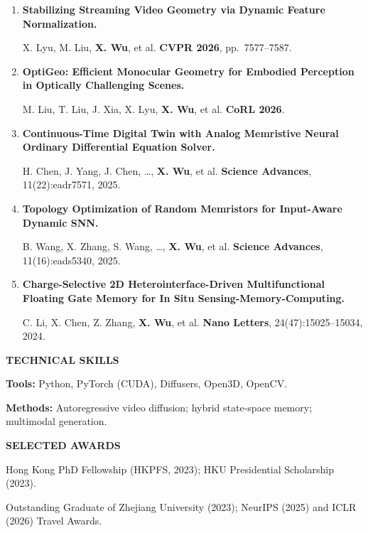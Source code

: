 \documentclass[a4paper]{article}
\newcommand{\cvsection}[1]{%
  \par\vspace{2.0pt}%
  {\color{cvblue}\fontsize{11}{12.2}\selectfont\bfseries\MakeUppercase{#1}}\par
  \vspace{-4pt}{\color{cvblue}\rule{\textwidth}{0.4pt}}\par\vspace{1.0pt}%
}
\begin{document}
{\begin{enumerate}[resume,leftmargin=1.6em,labelsep=0.38em,itemsep=0.4pt,topsep=1.3pt,parsep=0pt,partopsep=0pt]
M. Liu, X. Lyu, T. Ren, P. Dai, \textbf{X. Wu}, et al. \hfill \textbf{ECCV 2026}.
\item \textbf{Stabilizing Streaming Video Geometry via Dynamic Feature Normalization.}\par
X. Lyu, M. Liu, \textbf{X. Wu}, et al. \hfill \textbf{CVPR 2026}, pp.\ 7577--7587.
\item \textbf{OptiGeo: Efficient Monocular Geometry for Embodied Perception in Optically Challenging Scenes.}\par
M. Liu, T. Liu, J. Xia, X. Lyu, \textbf{X. Wu}, et al. \hfill \textbf{CoRL 2026}.
\item \textbf{Continuous-Time Digital Twin with Analog Memristive Neural Ordinary Differential Equation Solver.}\par
H. Chen, J. Yang, J. Chen, \ldots, \textbf{X. Wu}, et al. \hfill \textbf{Science Advances}, 11(22):eadr7571, 2025.
\item \textbf{Topology Optimization of Random Memristors for Input-Aware Dynamic SNN.}\par
B. Wang, X. Zhang, S. Wang, \ldots, \textbf{X. Wu}, et al. \hfill \textbf{Science Advances}, 11(16):eads5340, 2025.
\item \textbf{Charge-Selective 2D Heterointerface-Driven Multifunctional Floating Gate Memory for In Situ Sensing-Memory-Computing.}\par
C. Li, X. Chen, Z. Zhang, \textbf{X. Wu}, et al. \hfill \textbf{Nano Letters}, 24(47):15025--15034, 2024.
\end{enumerate}}

\cvsection{Technical Skills}
\textbf{Tools:} Python, PyTorch (CUDA), Diffusers, Open3D, OpenCV.\par
\textbf{Methods:} Autoregressive video diffusion; hybrid state-space memory; multimodal generation.


\cvsection{Selected Awards}
Hong Kong PhD Fellowship (HKPFS, 2023); HKU Presidential Scholarship (2023).\par
Outstanding Graduate of Zhejiang University (2023); NeurIPS (2025) and ICLR (2026) Travel Awards.
\end{document}
